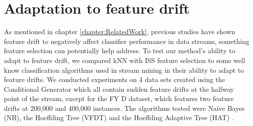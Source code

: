 \section{Adaptation to feature drift}
As mentioned in chapter \ref{chapter:RelatedWork}, previous studies have shown feature drift to negatively affect classifier performance in data streams, something feature selection can potentially help address. To test our method's ability to adapt to feature drift, we compared kNN with ISS feature selection to some well know classification algorithms used in stream mining in their ability to adapt to feature drifts. We conducted experiments on 4 data sets created using the Conditional Generator which all contain sudden feature drifts at the halfway point of the stream, except for the FY D dataset, which features two feature drifts at 200,000 and 400,000 instances. The algorithms tested were Naive Bayes (NB), the Hoeffding Tree (VFDT) \citep{Domingos:2000:MHD:347090.347107} and the Hoeffding Adaptive Tree (HAT) \citep{Bifet:2009:ALE:1617420.1617445}.

